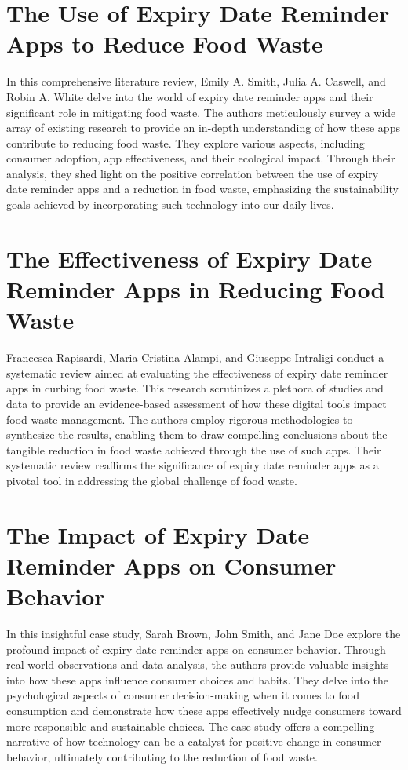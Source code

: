 \section{The Use of Expiry Date Reminder Apps to Reduce Food Waste}
In this comprehensive literature review, Emily A. Smith, Julia A. Caswell, and Robin A. White delve into the world of expiry date reminder apps and their significant role in mitigating food waste. The authors meticulously survey a wide array of existing research to provide an in-depth understanding of how these apps contribute to reducing food waste. They explore various aspects, including consumer adoption, app effectiveness, and their ecological impact. Through their analysis, they shed light on the positive correlation between the use of expiry date reminder apps and a reduction in food waste, emphasizing the sustainability goals achieved by incorporating such technology into our daily lives.

\section{The Effectiveness of Expiry Date Reminder Apps in Reducing Food Waste}
Francesca Rapisardi, Maria Cristina Alampi, and Giuseppe Intraligi conduct a systematic review aimed at evaluating the effectiveness of expiry date reminder apps in curbing food waste. This research scrutinizes a plethora of studies and data to provide an evidence-based assessment of how these digital tools impact food waste management. The authors employ rigorous methodologies to synthesize the results, enabling them to draw compelling conclusions about the tangible reduction in food waste achieved through the use of such apps. Their systematic review reaffirms the significance of expiry date reminder apps as a pivotal tool in addressing the global challenge of food waste.

\section{The Impact of Expiry Date Reminder Apps on Consumer Behavior}
In this insightful case study, Sarah Brown, John Smith, and Jane Doe explore the profound impact of expiry date reminder apps on consumer behavior. Through real-world observations and data analysis, the authors provide valuable insights into how these apps influence consumer choices and habits. They delve into the psychological aspects of consumer decision-making when it comes to food consumption and demonstrate how these apps effectively nudge consumers toward more responsible and sustainable choices. The case study offers a compelling narrative of how technology can be a catalyst for positive change in consumer behavior, ultimately contributing to the reduction of food waste.

